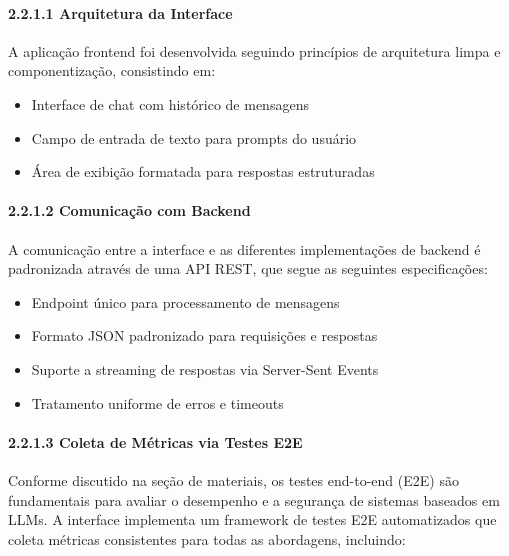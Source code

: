 \documentclass[
]{article}
\providecommand{\tightlist}{%
  \setlength{\itemsep}{0pt}\setlength{\parskip}{0pt}}
\begin{document}
\paragraph{2.2.1.1 Arquitetura da
Interface}\label{arquitetura-da-interface}

A aplicação frontend foi desenvolvida seguindo princípios de arquitetura
limpa e componentização, consistindo em:

\begin{itemize}
\tightlist
\item
  Interface de chat com histórico de mensagens
\item
  Campo de entrada de texto para prompts do usuário
\item
  Área de exibição formatada para respostas estruturadas
\end{itemize}

\paragraph{2.2.1.2 Comunicação com
Backend}\label{comunicauxe7uxe3o-com-backend}

A comunicação entre a interface e as diferentes implementações de
backend é padronizada através de uma API REST, que segue as seguintes
especificações:

\begin{itemize}
\tightlist
\item
  Endpoint único para processamento de mensagens
\item
  Formato JSON padronizado para requisições e respostas
\item
  Suporte a streaming de respostas via Server-Sent Events
\item
  Tratamento uniforme de erros e timeouts
\end{itemize}

\paragraph{2.2.1.3 Coleta de Métricas via Testes
E2E}\label{coleta-de-muxe9tricas-via-testes-e2e}

Conforme discutido na seção de materiais, os testes end-to-end (E2E) são
fundamentais para avaliar o desempenho e a segurança de sistemas
baseados em LLMs. A interface implementa um framework de testes E2E
automatizados que coleta métricas consistentes para todas as abordagens,
incluindo:
\end{document}
